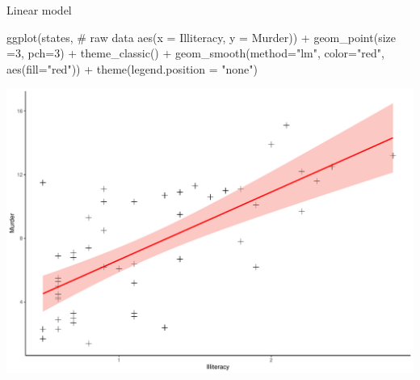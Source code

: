 \documentclass[
  ignorenonframetext,
]{beamer}
\newenvironment{Shaded}{\begin{snugshade}}{\end{snugshade}}
\newcommand{\AttributeTok}[1]{\textcolor[rgb]{0.00,0.34,0.68}{#1}}
\newcommand{\CommentTok}[1]{\textcolor[rgb]{0.54,0.53,0.53}{#1}}
\newcommand{\DecValTok}[1]{\textcolor[rgb]{0.69,0.50,0.00}{#1}}
\newcommand{\FunctionTok}[1]{\textcolor[rgb]{0.39,0.29,0.61}{#1}}
\newcommand{\NormalTok}[1]{\textcolor[rgb]{0.12,0.11,0.11}{#1}}
\newcommand{\SpecialCharTok}[1]{\textcolor[rgb]{0.24,0.68,0.91}{#1}}
\newcommand{\StringTok}[1]{\textcolor[rgb]{0.75,0.01,0.01}{#1}}
\begin{document}
\begin{frame}[fragile]{Linear model}
\protect\hypertarget{linear-model}{}
\begin{Shaded}
\begin{Highlighting}[]
\FunctionTok{ggplot}\NormalTok{(states,  }\CommentTok{\# raw data}
               \FunctionTok{aes}\NormalTok{(}\AttributeTok{x =}\NormalTok{ Illiteracy, }\AttributeTok{y =}\NormalTok{ Murder)) }\SpecialCharTok{+} \FunctionTok{geom\_point}\NormalTok{(}\AttributeTok{size =}\DecValTok{3}\NormalTok{, }\AttributeTok{pch=}\DecValTok{3}\NormalTok{) }\SpecialCharTok{+} \FunctionTok{theme\_classic}\NormalTok{() }\SpecialCharTok{+} 
  \FunctionTok{geom\_smooth}\NormalTok{(}\AttributeTok{method=}\StringTok{"lm"}\NormalTok{, }\AttributeTok{color=}\StringTok{"red"}\NormalTok{, }\FunctionTok{aes}\NormalTok{(}\AttributeTok{fill=}\StringTok{"red"}\NormalTok{)) }\SpecialCharTok{+} \FunctionTok{theme}\NormalTok{(}\AttributeTok{legend.position =} \StringTok{"none"}\NormalTok{)}
\end{Highlighting}
\end{Shaded}

\begin{center}\includegraphics[width=0.7\linewidth]{Practice_files/figure-beamer/unnamed-chunk-66-1} \end{center}
\end{frame}
\end{document}

